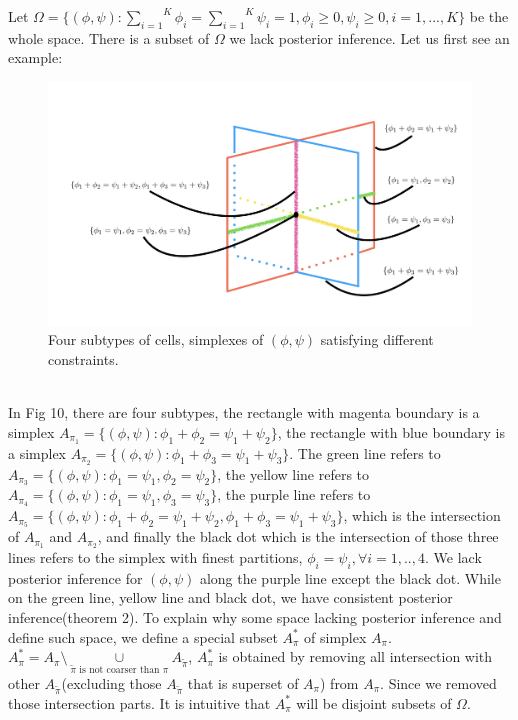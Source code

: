 \documentclass[11pt]{amsart}
\begin{document}
Let $\Omega = \{(\phi, \psi): \overset{K}{\underset{i = 1}\sum}\phi_i = \overset{K}{\underset{i = 1}\sum}\psi_i = 1, \phi_i \geq 0, \psi_i \geq 0 , i = 1,..., K\}$ be the whole space. There is a subset of $\Omega$ we lack posterior inference. Let us first see an example:
\begin{figure}[h]
\includegraphics[scale = 0.5]{Figs/overlap.png}
 \caption{Four subtypes of cells,  simplexes of $(\phi,\psi)$ satisfying different constraints.}
  \label{fig:1}
\end{figure}
\hfill\\
In Fig 10, there are four subtypes, the rectangle with magenta boundary is a simplex $A_{\pi_1} = \{(\phi,\psi) : \phi_1 + \phi_2 = \psi_1 + \psi_2\}$, the rectangle with blue boundary is a simplex $A_{\pi_2} = \{(\phi,\psi) : \phi_1 + \phi_3 = \psi_1 + \psi_3\}$. The green line refers to $A_{\pi_3} = \{(\phi,\psi) : \phi_1 = \psi_1, \phi_2 = \psi_2\}$, the yellow line refers to $A_{\pi_4} = \{(\phi,\psi) : \phi_1 = \psi_1, \phi_3 = \psi_3\}$, the purple line refers to $A_{\pi_5} = \{(\phi,\psi) : \phi_1 + \phi_2 = \psi_1 + \psi_2, \phi_1 + \phi_3 = \psi_1 + \psi_3\}$, which is the intersection of $A_{\pi_1}$ and $A_{\pi_2}$, and finally the black dot which is the intersection of those three lines refers to the simplex with finest partitions, $\phi_i = \psi_i, \forall i = 1,..,4$. We lack posterior inference for $(\phi,\psi)$ along the purple line except the black dot. While on the green line, yellow line and black dot, we have consistent posterior inference(theorem 2). To explain why some space lacking posterior inference and define such space, we define a special subset $A_\pi^*$ of simplex $A_\pi$. $A_\pi^* = A_\pi\setminus \underset{\tilde{\pi} \text{ is not coarser than } \pi }\cup A_{\tilde{\pi}}$, $A_\pi^*$ is obtained by removing all intersection with other $A_{\tilde{\pi}}$(excluding those $A_{\tilde{\pi}}$ that is superset of $A_\pi$) from $A_\pi$. Since we removed those intersection parts. It is intuitive that $A_\pi^*$ will be disjoint subsets of $\Omega$.\\
\end{document}
